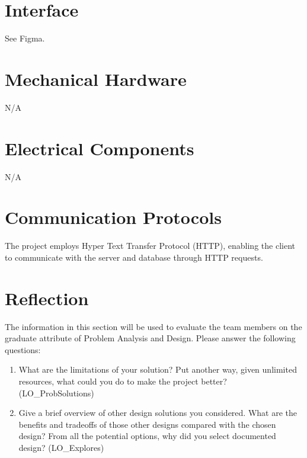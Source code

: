 \documentclass[12pt, titlepage]{article}
\begin{document}
	
	
	\newpage{}
	
	\appendix
	
	\section{Interface}
	
	
	See Figma.
	
	\section{Mechanical Hardware}
	N/A
	
	\section{Electrical Components}
	N/A
	
	\section{Communication Protocols}
	The project employs Hyper Text Transfer Protocol (HTTP), enabling the client to communicate with the server and database through HTTP requests.
	
	\section{Reflection}
	
	The information in this section will be used to evaluate the team members on the
	graduate attribute of Problem Analysis and Design.  Please answer the following questions:
	
	\begin{enumerate}
		\item What are the limitations of your solution?  Put another way, given
		unlimited resources, what could you do to make the project better? (LO\_ProbSolutions)
		\item Give a brief overview of other design solutions you considered.  What
		are the benefits and tradeoffs of those other designs compared with the chosen
		design?  From all the potential options, why did you select documented design?
		(LO\_Explores)
	\end{enumerate}
	
\end{document}
